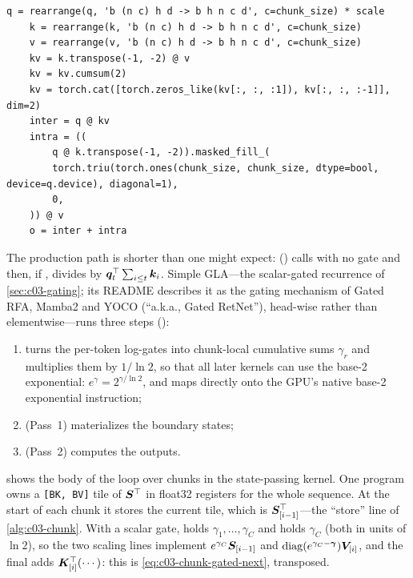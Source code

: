 \begin{sloppypar}
\begin{lstlisting}[caption={Excerpt from \texttt{repos/\allowbreak fla-org\_\_flash-linear-attention/\allowbreak fla/\allowbreak ops/\allowbreak linear\_attn/\allowbreak naive.py} (function \texttt{naive\_chunk\_linear\_attn}).},label={lst:c03-fla-la-naive}]
    q = rearrange(q, 'b (n c) h d -> b h n c d', c=chunk_size) * scale
    k = rearrange(k, 'b (n c) h d -> b h n c d', c=chunk_size)
    v = rearrange(v, 'b (n c) h d -> b h n c d', c=chunk_size)
    kv = k.transpose(-1, -2) @ v
    kv = kv.cumsum(2)
    kv = torch.cat([torch.zeros_like(kv[:, :, :1]), kv[:, :, :-1]], dim=2)
    inter = q @ kv
    intra = ((
        q @ k.transpose(-1, -2)).masked_fill_(
        torch.triu(torch.ones(chunk_size, chunk_size, dtype=bool, device=q.device), diagonal=1),
        0,
    )) @ v
    o = inter + intra
\end{lstlisting}

The production path is shorter than one might expect: 
() calls
 with no gate and then, if , divides by
$\bm{q}_t^{\top}\sum_{i\le t}\bm{k}_i$. Simple GLA---the scalar-gated recurrence of
\cref{sec:c03-gating}; its README describes it as the gating mechanism of Gated RFA, Mamba2 and
YOCO (``a.k.a., Gated RetNet''), head-wise rather than elementwise---runs three steps ():
\begin{enumerate}
\item {} turns the per-token log-gates into
chunk-local cumulative sums $\gamma_r$ and multiplies them by $1/\ln2$, so that all later kernels
can use the base-2 exponential: $e^{\gamma}=2^{\gamma/\ln2}$, and  maps directly onto
the GPU's native base-2 exponential instruction;
\item {} (Pass~1) materializes the boundary states;
\item {} (Pass~2) computes the outputs.
\end{enumerate}

 shows the body of the loop over chunks in the state-passing kernel.
One program owns a \texttt{[BK, BV]} tile  of $\bm{S}^{\top}$ in float32 registers for the
whole sequence. At the start of each chunk it stores the current tile, which is
$\bm{S}_{[i-1]}^{\top}$---the ``store'' line of \cref{alg:c03-chunk}. With a scalar gate,  holds
$\gamma_1,\dots,\gamma_C$ and  holds $\gamma_C$ (both in units of $\ln 2$), so the
two scaling lines implement $e^{\gamma_C}\bm{S}_{[i-1]}$ and $\operatorname{diag}(e^{\gamma_C-\bm\gamma})\bm{V}_{[i]}$,
and the final  adds $\bm{K}_{[i]}^{\top}(\cdots)$: this is
\cref{eq:c03-chunk-gated-next}, transposed.


\end{sloppypar}
